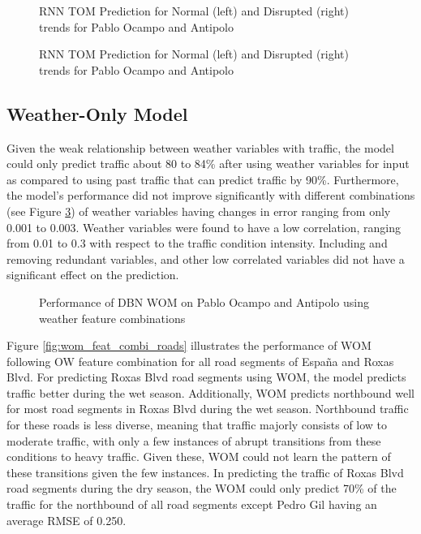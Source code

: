 \begin{figure}[h]
  \centering
  \captionsetup{justification=centering}
  \caption{RNN TOM Prediction for Normal (left) and Disrupted (right) trends for Pablo Ocampo and Antipolo}
  \label{fig:rnn_dbn_tom_pocampo}
\end{figure}

\begin{figure}[h]
  \centering
  \captionsetup{justification=centering}
  \caption{RNN TOM Prediction for Normal (left) and Disrupted (right) trends for Pablo Ocampo and Antipolo}
  \label{fig:RNN_TOM_normal_disrption_pocampo_antipolo_wet}
\end{figure}


\subsection{Weather-Only Model}
Given the weak relationship between weather variables with traffic, the model could only predict traffic about 80 to 84\% after using weather variables for input as compared to using past traffic that can predict traffic by 90\%. Furthermore, the model’s performance did not improve significantly with different combinations (see Figure \ref{fig:wom_diff_feat_combi}) of weather variables having changes in error ranging from only 0.001 to 0.003. Weather variables were found to have a low correlation, ranging from 0.01 to 0.3 with respect to the traffic condition intensity. Including and removing redundant variables, and other low correlated variables did not have a significant effect on the prediction. 

\begin{figure}[h]
  \centering
  \captionsetup{justification=centering}
  \caption{Performance of DBN WOM on Pablo Ocampo and Antipolo using weather feature combinations}
  \label{fig:wom_diff_feat_combi}
\end{figure}


Figure \ref{fig:wom_feat_combi_roads} illustrates the performance of WOM following OW feature combination for all road segments of España and Roxas Blvd. For predicting Roxas Blvd road segments using WOM, the model predicts traffic better during the wet season. Additionally, WOM predicts northbound well for most road segments in Roxas Blvd during the wet season. Northbound traffic for these roads is less diverse, meaning that traffic majorly consists of low to moderate traffic, with only a few instances of abrupt transitions from these conditions to heavy traffic. Given these, WOM could not learn the pattern of these transitions given the few instances. In predicting the traffic of Roxas Blvd road segments during the dry season, the WOM could only predict 70\% of the traffic for the northbound of all road segments except Pedro Gil having an average RMSE of 0.250. 

